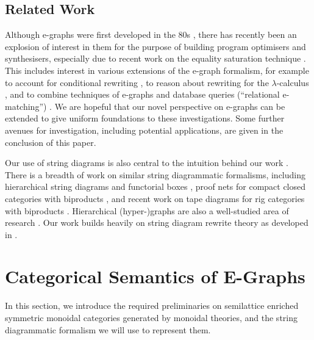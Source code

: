 \subsection{Related Work}

Although e-graphs were first developed in the 80s \cite{nelson1980techniques}, there has recently been an explosion of interest in them for the purpose of building program optimisers and synthesisers, especially due to recent work on the equality saturation technique \cite{10.1145/1594834.1480915, griggio_proceedings_2022, EggPaper,flatt_small_2022}.  This includes interest in various extensions of the e-graph formalism, for example to account for conditional rewriting \cite{singher2023colored},  to reason about rewriting for the $\lambda$-calculus \cite{koehler2022sketchguided},  and to combine techniques of e-graphs and database queries (``relational e-matching'') \cite{zhang_relational_2022}.  We are hopeful that our novel perspective on e-graphs can be extended to give uniform foundations to these investigations.  Some further avenues for investigation, including potential applications, are given in the conclusion of this paper. 

Our use of string diagrams is also central to the intuition behind our work \cite{Selinger_2010, joyal_geometry_1991}.  There is a breadth of work on similar string diagrammatic formalisms,  including hierarchical string diagrams \cite{ghica_hierarchical_2023} and functorial boxes \cite{mellies_functorial_2006},  proof nets for compact closed categories with biproducts \cite{duncan_generalised_2009}, and recent work on tape diagrams for rig categories with biproducts \cite{bonchi_tape_nodate}. 
Hierarchical (hyper-)graphs are also a well-studied area of research \cite{plump:hierarchical-graphs, montanari:gs-lambda, palacz:hierarchical-transform, Gaducci:hierarchical-graphs, Ghica:hierarchical}. 
Our work builds heavily on string diagram rewrite theory as developed in \cite{bonchi_string_2022,bonchi_string_2022-1, bonchi_string_2022-2}. 

\section{Categorical Semantics of E-Graphs}
In this section,  we introduce the required preliminaries on semilattice enriched symmetric monoidal categories generated by monoidal theories,  and the string diagrammatic formalism we will use to represent them.  

